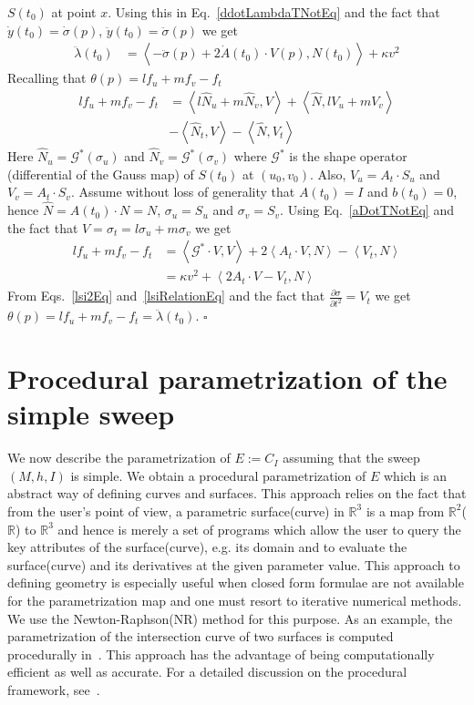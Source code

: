 \documentclass{elsart5p}
\begin{document}
$S(t_0)$ at point $x$.  Using this in Eq.~\ref{ddotLambdaTNotEq} and the fact that  $\dot{y}(t_0) = \dot{\sigma}(p)$, $\ddot{y}(t_0) = \ddot{\sigma}(p)$ we get
\begin{align}
\ddot{\lambda}(t_0)  &= \left < -\ddot{\sigma}(p) + 2\dot{A}(t_0) \cdot V(p) , N(t_0) \right > + \kappa v^2  \label{lsi2Eq}
\end{align}
Recalling that $\theta(p)=lf_u +mf_v -f_t$ 
\begin{align*}
l f_u + m f_v - f_t &= \left< l\hat{N}_u + m\hat{N}_v, V\right> + \left<\hat{N}, l V_u + m V_v \right >\\  &-  \left< \hat{N}_t, V\right > - \left<\hat{N} ,V_t \right >
\end{align*}
Here $\hat{N}_u = \mathcal{G}^*(\sigma_u)$ and $\hat{N}_v = \mathcal{G}^*(\sigma_v)$ 
where $\mathcal{G}^*$ is the shape operator (differential of the Gauss map) of $S(t_0)$ at $(u_0,v_0)$.  
Also, $V_u = A_t \cdot S_u$ and $V_v = A_t \cdot S_v$.  Assume without loss of generality that $A(t_0) = I$ 
and $b(t_0) = 0$, hence $\hat{N} = A(t_0) \cdot N = N$, $\sigma_u = S_u$ and $\sigma_v = S_v$. Using 
Eq.~\ref{aDotTNotEq} and the fact that $V=\sigma_t = l\sigma_u+m\sigma_v$  we get
\begin{align}
\nonumber l f_u + m f_v - f_t &= \left< \mathcal{G}^* \cdot V, V \right > + 2\left<A_t \cdot V ,N \right> - \left <V_t, N\right >  \\
			& = \kappa v^2  + \left < 2A_t \cdot V - V_t  , N \right > \label{lsiRelationEq}
\end{align}
From Eqs.~\ref{lsi2Eq} and~\ref{lsiRelationEq} and the fact that $\frac{\partial \sigma}{\partial t^2}=V_t$ we get 
$\theta(p) = l f_u + m f_v - f_t = \ddot{\lambda}(t_0)$.
\hfill $\square$

\section{Procedural parametrization of the simple sweep} \label{proceduralSec}

We now describe the parametrization of $E:=C_I$ assuming that the sweep $(M,h,I)$ is simple. 
We obtain a procedural parametrization of $E$ which is an abstract way of defining curves and surfaces. 
This approach relies on the fact that from the user's point of view, a parametric surface(curve) in $\mathbb{R}^3$ 
is a map from $\mathbb{R}^2$($\mathbb{R}$) to $\mathbb{R}^3$ and hence is merely a set of programs 
which allow the user to query the key attributes of the surface(curve), e.g. its domain and to evaluate the 
surface(curve) and its derivatives at the given parameter value.  This approach to defining geometry is especially 
useful when closed form formulae are not available for the parametrization map and one must resort to iterative 
numerical methods.  We use the Newton-Raphson(NR) method for this purpose.  As an example, the parametrization 
of the intersection curve of two surfaces is computed procedurally in~\cite{procedural}.  This approach has the 
advantage of being computationally efficient as well as accurate.  For a detailed discussion on the procedural framework, 
see~\cite{sohoni}.
\end{document}
